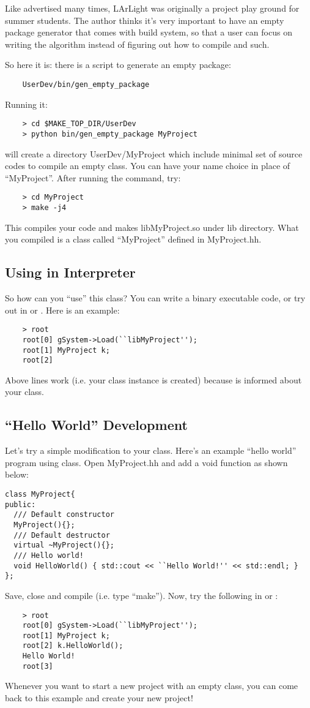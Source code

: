 Like advertised many times, LArLight was originally a \CPP project play ground for summer students. The author thinks it's very important to have an empty \CPP package generator that comes with build system, so that a user can focus on writing the algorithm instead of figuring out how to compile and such.

So here it is: there is a \python script to generate an empty \CPP package:
\begin{lstlisting}
    UserDev/bin/gen_empty_package
\end{lstlisting}
Running it:
\begin{lstlisting}
    > cd $MAKE_TOP_DIR/UserDev
    > python bin/gen_empty_package MyProject
\end{lstlisting}
will create a directory {\ttfamily UserDev/MyProject} which include minimal set of source codes to compile an empty \CPP class. You can have your name choice in place of ``MyProject''. After running the command, try:
\begin{lstlisting}
    > cd MyProject
    > make -j4
\end{lstlisting}
This compiles your code and makes {\ttfamily libMyProject.so} under {\ttfamily lib} directory.
What you compiled is a \CPP class called ``MyProject'' defined in {\ttfamily MyProject.hh}. 

\subsection{Using in Interpreter}

So how can you ``use'' this \CPP class? You can write a binary executable code, or try out in \CINT or \PyROOT. Here is an example:
\begin{lstlisting}
    > root
    root[0] gSystem->Load(``libMyProject'');
    root[1] MyProject k;
    root[2]
\end{lstlisting}
Above lines work (i.e. your class instance is created) because \CINT is informed about your class. 

\subsection{``Hello World'' Development}
\label{sec:helloworld}
Let's try a simple modification to your class. Here's an example ``hello world'' program using \CPP class. Open {\ttfamily MyProject.hh} and add a {\ttfamily void} function as shown below:
\begin{lstlisting}
class MyProject{
public:
  /// Default constructor
  MyProject(){};
  /// Default destructor
  virtual ~MyProject(){};
  /// Hello world!
  void HelloWorld() { std::cout << ``Hello World!'' << std::endl; }
};
\end{lstlisting}
Save, close and compile (i.e. type ``make''). Now, try the following in \CINT or \PyROOT:
\begin{lstlisting}
    > root
    root[0] gSystem->Load(``libMyProject'');
    root[1] MyProject k;
    root[2] k.HelloWorld();
    Hello World!
    root[3]
\end{lstlisting}

Whenever you want to start a new project with an empty class, you can come back to this example and create your new \CPP project!



